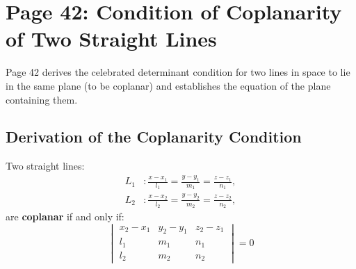\section{Page 42: Condition of Coplanarity of Two Straight Lines}
\label{sec:page42}

\begin{conceptbox}
Page 42 derives the celebrated determinant condition for two lines in space to lie in the same plane (to be coplanar) and establishes the equation of the plane containing them.
\end{conceptbox}

\subsection{Derivation of the Coplanarity Condition}
\begin{theorembox}
Two straight lines:
\begin{align}
    L_1 &: \frac{x - x_1}{l_1} = \frac{y - y_1}{m_1} = \frac{z - z_1}{n_1}, \label{eq:p42_L1} \\
    L_2 &: \frac{x - x_2}{l_2} = \frac{y - y_2}{m_2} = \frac{z - z_2}{n_2}, \label{eq:p42_L2}
\end{align}
are \textbf{coplanar} if and only if:
\begin{equation}
    \boxed{\begin{vmatrix}
    x_2 - x_1 & y_2 - y_1 & z_2 - z_1 \\
    l_1 & m_1 & n_1 \\
    l_2 & m_2 & n_2
    \end{vmatrix} = 0}
\end{equation}
\end{theorembox}

